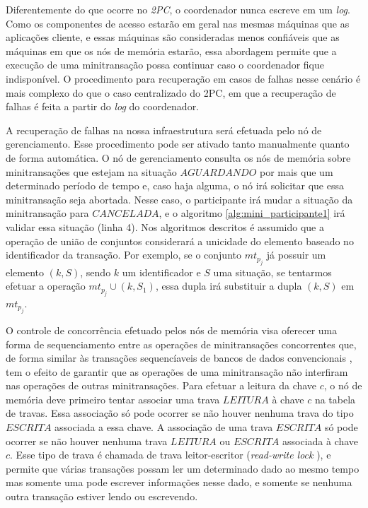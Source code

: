 \documentclass[11pt,twoside,a4paper]{book}
\begin{document}
Diferentemente do que ocorre no \emph{2PC}, o coordenador nunca escreve em um \emph{log}. Como os componentes de acesso estarão em geral nas mesmas máquinas que as aplicações cliente, e essas máquinas são consideradas menos confiáveis que as máquinas em que os nós de memória estarão, essa abordagem permite que a execução de uma minitransação possa continuar caso o coordenador fique indisponível. O procedimento para recuperação em casos de falhas nesse cenário é mais complexo do que o caso centralizado do 2PC, em que a recuperação de falhas é feita a partir do \emph{log} do coordenador.

A recuperação de falhas na nossa infraestrutura será efetuada pelo nó de gerenciamento. Esse procedimento pode ser ativado tanto manualmente quanto de forma automática. O nó de gerenciamento consulta os nós de memória sobre minitransações que estejam na situação $AGUARDANDO$ por mais que um determinado período de tempo e, caso haja alguma, o nó irá solicitar que essa minitransação seja abortada. Nesse caso, o participante irá mudar a situação da minitransação para $CANCELADA$, e o algoritmo \ref{alg:mini_participante1} irá validar essa situação (linha 4). Nos algoritmos descritos é assumido que a operação de união de conjuntos considerará a unicidade do elemento baseado no identificador da transação. Por exemplo, se o conjunto $mt_{p_j}$ já possuir um elemento $(k, S)$, sendo $k$ um identificador e $S$ uma situação, se tentarmos efetuar a operação $mt_{p_j} \cup (k, S_1)$, essa dupla irá substituir a dupla $(k,S)$ em $mt_{p_j}$.

O controle de concorrência efetuado pelos nós de memória visa oferecer uma forma de sequenciamento entre as operações de minitransações concorrentes que, de forma similar às transações sequencíaveis de bancos de dados convencionais \cite{vaca}, tem o efeito de garantir que as operações de uma minitransação não interfiram nas operações de outras minitransações. Para efetuar a leitura da chave $c$, o nó de memória deve primeiro tentar associar uma trava $LEITURA$ à chave $c$ na tabela de travas. Essa associação só pode ocorrer se não houver nenhuma trava do tipo $ESCRITA$ associada a essa chave. A associação de uma trava $ESCRITA$ só pode ocorrer se não houver nenhuma trava $LEITURA$ ou $ESCRITA$ associada à chave $c$. Esse tipo de trava é chamada de trava leitor-escritor (\emph{read-write lock} \cite{ipc}), e permite que várias transações possam ler um determinado dado ao mesmo tempo mas somente uma pode escrever informações nesse dado, e somente se nenhuma outra transação estiver lendo ou escrevendo.
\end{document}
